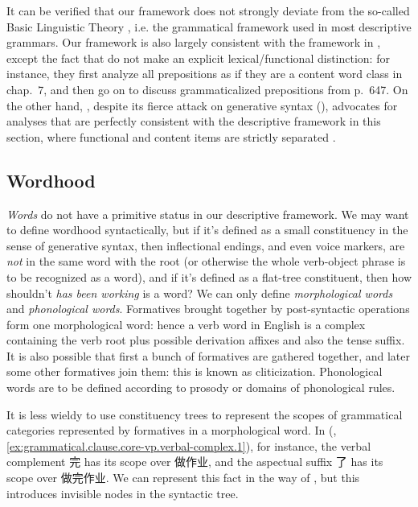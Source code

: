 \documentclass[UTF8, a4paper, oneside, scheme=plain, 12pt]{ctexrep}
\newcommand*{\citechap}[1]{chap.~{#1}}
\newcommand*{\citepage}[1]{p.~{#1}}
\newcommand*{\term}[1]{\emph{#1}}
\newcommand{\form}[1]{\emph{#1}}
\begin{document}
{It can be verified that our framework does not strongly deviate from the so-called Basic Linguistic Theory
\citep{dixon2009basic},
i.e. the grammatical framework used in most descriptive grammars.
Our framework is also largely consistent with the framework in \citet{cgel},
except the fact that \citet{cgel} do not make an explicit lexical/functional distinction:
for instance, they first analyze all prepositions as if they are a content word class
in \citechap{7},
and then go on to discuss grammaticalized prepositions from \citepage{647}.
On the other hand, \citet{dixon2009basic}, despite its fierce attack on generative syntax
(),
advocates for analyses that are perfectly consistent with the descriptive framework in this section,
where functional and content items are strictly separated
\citep[\citepage{49}]{dixon2009basic}.

\subsection{Wordhood}\label{sec:intro.theory.word}

\term{Words} do not have a primitive status in our descriptive framework.
We may want to define wordhood syntactically,
but if it's defined as a small constituency in the sense of generative syntax,
then inflectional endings, and even voice markers,
are \emph{not} in the same word with the root
(or otherwise the whole verb-object phrase is to be recognized as a word),
and if it's defined as a flat-tree constituent,
then how shouldn't \form{has been working} is a word?
We can only define \emph{morphological words} and \emph{phonological words}.
Formatives brought together by post-syntactic operations form one morphological word:
hence a verb word in English is a complex containing
the verb root plus possible derivation affixes and also the tense suffix.
It is also possible that first a bunch of formatives are gathered together,
and later some other formatives join them:
this is known as cliticization.
Phonological words are to be defined according to prosody
or domains of phonological rules.

It is less wieldy to use constituency trees to represent 
the scopes of grammatical categories represented by formatives
in a morphological word.
In (, \ref{ex:grammatical.clause.core-vp.verbal-complex.1}),
for instance, the verbal complement 完 has its scope over 做作业,
and the aspectual suffix 了 has its scope over 做完作业.
We can represent this fact in the way of ,
but this introduces invisible nodes in the syntactic tree. 

}
\end{document}
